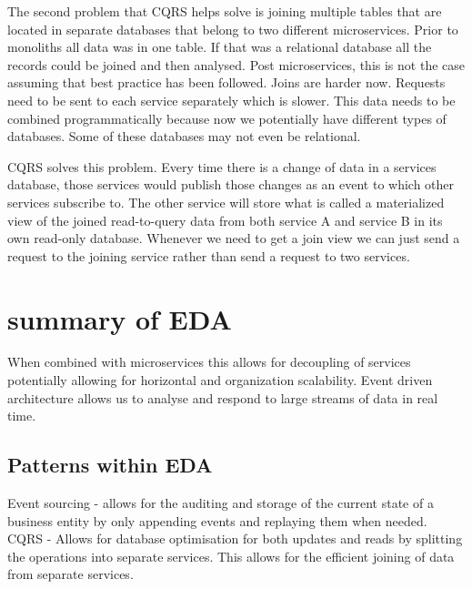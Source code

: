 \documentclass[a4paper, 11pt]{book}
\begin{document}
    The second problem that CQRS helps solve is joining multiple tables that are located in separate databases that belong to two different microservices.
    Prior to monoliths all data was in one table.
    If that was a relational database all the records could be joined and then analysed.
    Post microservices, this is not the case assuming that best practice has been followed.
    Joins are harder now.
    Requests need to be sent to each service separately which is slower.
    This data needs to be combined programmatically because now we potentially have different types of databases.
    Some of these databases may not even be relational.

    CQRS solves this problem.
    Every time there is a change of data in a services database, those services would publish those changes as an event to which other services subscribe to.
    The other service will store what is called a materialized view of the joined read-to-query data from both service A and service B in its own read-only database.
    Whenever we need to get a join view we can just send a request to the joining service rather than send a request to two services.


    \section{summary of EDA}
    When combined with microservices this allows for decoupling of services potentially allowing for horizontal and organization scalability.
    Event driven architecture allows us to analyse and respond to large streams of data in real time.

    \subsection{Patterns within EDA}
    Event sourcing - allows for the auditing and storage of the current state of a business entity by only appending events and replaying them when needed.
    CQRS - Allows for database optimisation for both updates and reads by splitting the operations into separate services.
    This allows for the efficient joining of data from separate services.
\end{document}
